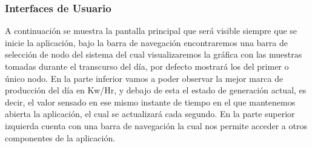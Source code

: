 \subsubsection{Interfaces de Usuario}\label{Interfaces de Usuario}

A continuación se muestra la pantalla principal que será visible siempre que se inicie la aplicación, bajo la barra de navegación encontraremos una barra de selección de nodo del sistema del cual visualizaremos la gráfica con las muestras tomadas durante el transcurso del día, por defecto mostrará los del primer o único nodo. En la parte inferior vamos a poder observar la mejor marca de producción del día en Kw/Hr, y debajo de esta el estado de generación actual, es decir, el valor sensado en ese mismo instante de tiempo en el que mantenemos abierta la aplicación, el cual se actualizará cada segundo. En la parte superior izquierda cuenta con una barra de navegación la cual nos permite acceder a otros componentes de la aplicación.  

